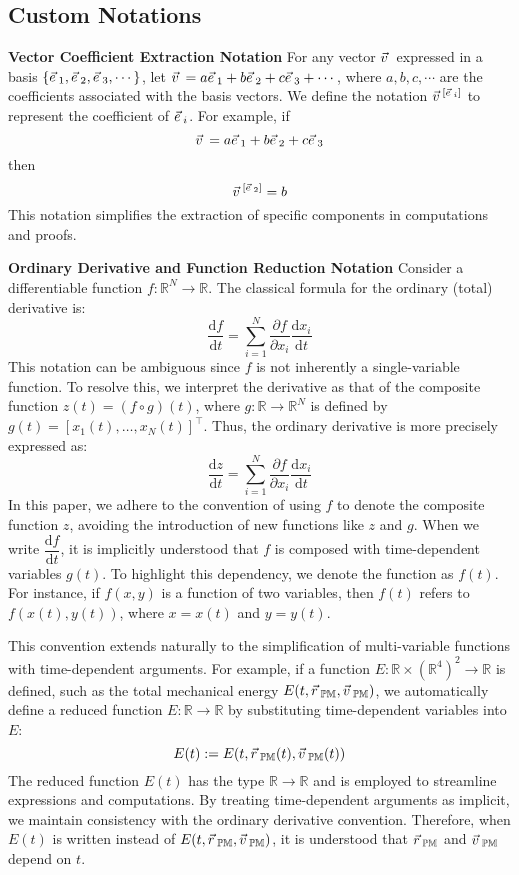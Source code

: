 \documentclass[12pt]{amsart}
\let\oldvec\vec
\renewcommand{\vec}[1]{\oldvec{#1}\hspace{0.1em}}
\begin{document}
\subsection{Custom Notations}

\textbf{Vector Coefficient Extraction Notation}  
   For any vector $\vec{v}$ expressed in a basis $\{\vec{e}_1, \vec{e}_2, \vec{e}_3, \cdots\}$, let $\vec{v} = a\vec{e}_1 + b\vec{e}_2 + c\vec{e}_3 + \cdots$, where $a, b, c, \cdots$ are the coefficients associated with the basis vectors. We define the notation $\vec{v}^{[\vec{e}_i]}$ to represent the coefficient of $\vec{e}_i$. For example, if
   $$
   \vec{v} = a \vec{e}_1 + b \vec{e}_2 + c \vec{e}_3
   $$
   then
   $$
   \vec{v}^{[\vec{e}_2]} = b
   $$
   This notation simplifies the extraction of specific components in computations and proofs.

\textbf{Ordinary Derivative and Function Reduction Notation}  
   Consider a differentiable function $f: \mathbb{R}^N \to \mathbb{R}$. The classical formula for the ordinary (total) derivative is:
   $$
   \dfrac{\mathrm{d} f}{\mathrm{d} t} = \sum_{i=1}^N \dfrac{\partial f}{\partial x_i} \dfrac{\mathrm{d} x_i}{\mathrm{d} t}
   $$
   This notation can be ambiguous since $f$ is not inherently a single-variable function. To resolve this, we interpret the derivative as that of the composite function $z(t) = (f \circ g)(t)$, where $g: \mathbb{R} \to \mathbb{R}^N$ is defined by $g(t) = [x_1(t), \dots, x_N(t)]^\top$. Thus, the ordinary derivative is more precisely expressed as:
   $$
   \dfrac{\mathrm{d} z}{\mathrm{d} t} = \sum_{i=1}^N \dfrac{\partial f}{\partial x_i} \dfrac{\mathrm{d} x_i}{\mathrm{d} t}
   $$
   In this paper, we adhere to the convention of using $f$ to denote the composite function $z$, avoiding the introduction of new functions like $z$ and $g$. When we write $\dfrac{\mathrm{d} f}{\mathrm{d} t}$, it is implicitly understood that $f$ is composed with time-dependent variables $g(t)$. To highlight this dependency, we denote the function as $f(t)$. For instance, if $f(x, y)$ is a function of two variables, then $f(t)$ refers to $f(x(t), y(t))$, where $x = x(t)$ and $y = y(t)$.

   This convention extends naturally to the simplification of multi-variable functions with time-dependent arguments. For example, if a function $E: \mathbb{R} \times (\mathbb{R}^4)^2 \to \mathbb{R}$ is defined, such as the total mechanical energy $E(t, \vec{r}_\mathbb{PM}, \vec{v}_\mathbb{PM})$, we automatically define a reduced function $E: \mathbb{R} \to \mathbb{R}$ by substituting time-dependent variables into $E$:
   $$
   E(t) := E(t, \vec{r}_\mathbb{PM}(t), \vec{v}_\mathbb{PM}(t))
   $$
   The reduced function $E(t)$ has the type $\mathbb{R} \to \mathbb{R}$ and is employed to streamline expressions and computations. By treating time-dependent arguments as implicit, we maintain consistency with the ordinary derivative convention. Therefore, when $E(t)$ is written instead of $E(t, \vec{r}_\mathbb{PM}, \vec{v}_\mathbb{PM})$, it is understood that $\vec{r}_\mathbb{PM}$ and $\vec{v}_\mathbb{PM}$ depend on $t$.
\end{document}
